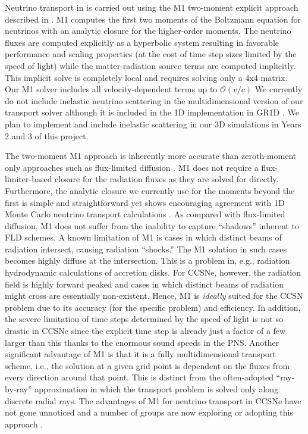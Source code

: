  \citet{OConnor:2017a}
Neutrino transport in \sparkmone is carried out using the M1 two-moment explicit approach described in \citet{OConnor:2015, OConnor:2015a}.
M1 computes the first two moments of the Boltzmann equation for neutrinos with an analytic closure for the higher-order moments.
The neutrino fluxes are computed explicitly as a hyperbolic system resulting in favorable performance and scaling properties (at the cost of time step sizes limited by the speed of light) while the matter-radiation source terms are computed implicitly.
This implicit solve is completely local and requires solving only a 4x4 matrix. 
Our M1 solver includes all velocity-dependent terms up to $\mathcal{O}(v/c)$
We currently do not include inelastic neutrino scattering in the multidimensional version of our transport solver although it is included in the 1D implementation in GR1D \citet{OConnor:2015}.
We plan to implement and include inelastic scattering in our 3D simulations in Years 2 and 3 of this project.

The two-moment M1 approach is inherently more accurate than zeroth-moment only approaches such as flux-limited diffusion \citep[e.g.,][]{Bruenn:2013, Dolence:2015, Lentz:2015}.
M1 does not require a flux-limiter-based closure for the radiation fluxes as they are solved for directly.
Furthermore, the analytic closure we currently use for the moments beyond the first is simple and straightforward yet shows encouraging agreement with 1D Monte Carlo neutrino transport calculations \citep{OConnor:2015, Murchikova:2017}.
As compared with flux-limited diffusion, M1 does not suffer from the inability to capture ``shadows'' inherent to FLD schemes.
A known limitation of M1 is cases in which distinct beams of radiation intersect, causing radiation ``shocks.''
The M1 solution in such cases becomes highly diffuse at the intersection.
This is a problem in, e.g., radiation hydrodynamic calculations of accretion disks.
For CCSNe, however, the radiation field is highly forward peaked and cases in which distinct beams of radiation might cross are essentially non-existent.
Hence, M1 is {\it ideally} suited for the CCSN problem due to its accuracy (for the specific problem) and efficiency.
In addition, the severe limitation of time steps determined by the speed of light is not so drastic in CCSNe since the explicit time step is already just a factor of a few larger than this thanks to the enormous sound speeds in the PNS.
Another significant advantage of M1 is that it is a fully multidimensional transport scheme, i.e., the solution at a given grid point is dependent on the fluxes from every direction around that point.
This is distinct from the often-adopted ``ray-by-ray'' approximation \citep[e.g.,][]{Bruenn:2013, Bruenn:2016, Muller:2012a, Hanke:2013, Melson:2015, Lentz:2015} in which the transport problem is solved only along discrete radial rays.
The advantages of M1 for neutrino transport in CCSNe have not gone unnoticed and a number of groups are now exploring or adopting this approach \citep{Just:2015, Kuroda:2016, Skinner:2016, Roberts:2016}.

